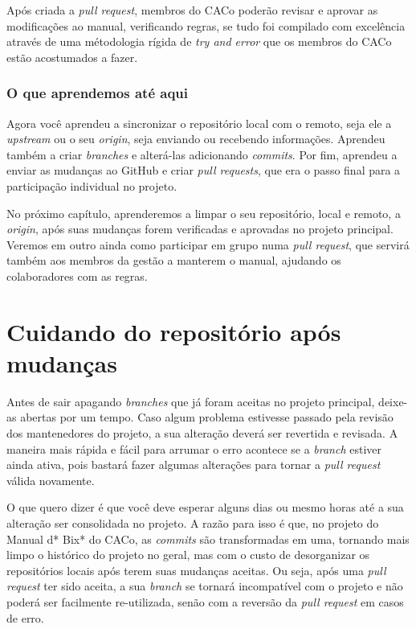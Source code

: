 \documentclass[a4paper,oneside,10pt]{memoir}
\begin{document}
Após criada a \emph{pull request}, membros do CACo poderão revisar e aprovar as
modificações ao manual, verificando regras, se tudo foi compilado com
excelência através de uma métodologia rígida de \emph{try and error} que os
membros do CACo estão acostumados a fazer.

\subsection{O que aprendemos até aqui}

Agora você aprendeu a sincronizar o repositório local com o remoto, seja ele
a \emph{upstream} ou o seu \emph{origin}, seja enviando ou recebendo
informações. Aprendeu também a criar \emph{branches} e alterá-las adicionando
\emph{commits}. Por fim, aprendeu a enviar as mudanças ao GitHub e criar
\emph{pull requests}, que era o passo final para a participação individual no
projeto.

No próximo capítulo, aprenderemos a limpar o seu repositório, local e remoto,
a \emph{origin}, após suas mudanças forem verificadas e aprovadas no projeto
principal. Veremos em outro ainda como participar em grupo numa \emph{pull
request}, que servirá também aos membros da gestão a manterem o manual,
ajudando os colaboradores com as regras.


\chapter{Cuidando do repositório após mudanças}

Antes de sair apagando \emph{branches} que já foram aceitas no projeto
principal, deixe-as abertas por um tempo. Caso algum problema estivesse passado
pela revisão dos mantenedores do projeto, a sua alteração deverá ser revertida
e revisada. A maneira mais rápida e fácil para arrumar o erro acontece se a
\emph{branch} estiver ainda ativa, pois bastará fazer algumas alterações para
tornar a \emph{pull request} válida novamente.

O que quero dizer é que você deve esperar alguns dias ou mesmo horas até a sua
alteração ser consolidada no projeto. A razão para isso é que, no projeto do
Manual d* Bix* do CACo, as \emph{commits} são transformadas em uma, tornando
mais limpo o histórico do projeto no geral, mas com o custo de desorganizar os
repositórios locais após terem suas mudanças aceitas. Ou seja, após uma
\emph{pull request} ter sido aceita, a sua \emph{branch} se tornará
incompatível com o projeto e não poderá ser facilmente re-utilizada, senão com
a reversão da \emph{pull request} em casos de erro.
\end{document}
